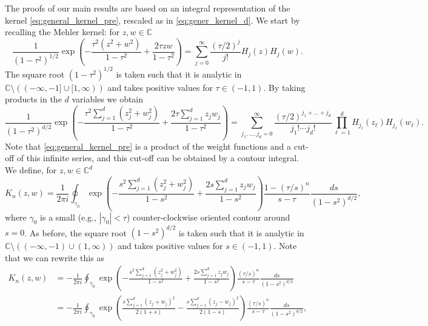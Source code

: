\documentclass[%
 jmp,
cp,  %
 amsmath,amsthm,amssymb,%
 reprint,%
onecolumn]{revtex4-2}
\begin{document}
The proofs of our main results are based on an integral representation of the kernel \eqref{eq:general_kernel_pre}, rescaled as in \eqref{eq:gener_kernel_d}. We start by recalling the Mehler kernel: for $z, w\in\mathbb C$
\begin{equation} \label{eq:Mehler}
    \frac{1}{(1-\tau^2)^{1/2}} \exp\left(-\frac{\tau^2(z^2+w^2)}{1-\tau^2} + \frac{2\tau z w}{1-\tau^2}\right)
= \sum_{j=0}^{\infty} \frac{(\tau/2)^j}{j!} H_j(z) H_j(w).
\end{equation}
The square root $(1-\tau^2)^{1/2}$ is taken such that it is analytic in $\mathbb C\setminus \left((-\infty,-1]\cup [1, \infty)\right)$ and takes positive values for $\tau \in (-1,1)$. 
By taking products in the $d$ variables we obtain 
\begin{equation} \label{eq:MehlerFordFactors}
    \frac{1}{(1-\tau^2)^{d/2}} \exp\left(-\frac{\tau^2\sum_{j=1}^d (z_j^2+w_j^2)}{1-\tau^2} + \frac{2\tau \sum_{j=1}^d z_j w_j}{1-\tau^2}\right)
= \sum_{j_1, \ldots,j_d=0}^{\infty} \frac{(\tau/2)^{j_1+\ldots +j_d}}{j_1! \cdots j_d!} \prod_{\ell=1}^d H_{j_\ell}(z_\ell) H_{j_\ell}(w_\ell).
\end{equation}
Note that \eqref{eq:general_kernel_pre} is a product of the weight functions and a cut-off of this infinite series, and this cut-off can be obtained by a contour integral. 
We define, for $z,w \in \mathbb C^d$
\begin{equation}
    K_n(z,w)= \frac{1}{2\pi i} \oint_{\gamma_0} \exp\left(-\frac{s^2\sum_{j=1}^d (z_j^2+w_j^2)}{1-s^2} + \frac{2 s \sum_{j=1}^d z_j w_j}{1-s^2}\right)
    \frac{1-(\tau/s)^n}{s-\tau} \frac{ds}{(1-s^2)^{d/2}},
\end{equation} 
where $\gamma_0$ is a small (e.g., $|\gamma_0|<\tau$) counter-clockwise oriented contour around $s=0$. As before, the square root $(1-s^2)^{d/2}$ is taken such that it is analytic in $\mathbb C\setminus \left((-\infty,-1)\cup (1, \infty)\right)$ and takes positive values for $s \in (-1,1)$.  Note that we can rewrite this as 
\begin{align} \nonumber
    K_n(z,w)&= - \frac{1}{2\pi i} \oint_{\gamma_0} \exp\left(-\frac{s^2\sum_{j=1}^d (z_j^2+w_j^2)}{1-s^2} + \frac{2 s \sum_{j=1}^d z_j w_j}{1-s^2}\right)
    \frac{(\tau/s)^n}{s-\tau} \frac{ds}{(1-s^2)^{d/2}}\\ \label{eq:integral_representation_kernel}
    &=- \frac{1}{2\pi i} \oint_{\gamma_0} \exp\left(\frac{s\sum_{j=1}^d (z_j+w_j)^2}{2(1+s)} - \frac{s\sum_{j=1}^d (z_j-w_j)^2}{2(1-s)}\right)
    \frac{(\tau/s)^n}{s-\tau} \frac{ds}{(1-s^2)^{d/2}},
\end{align} 
\end{document}
